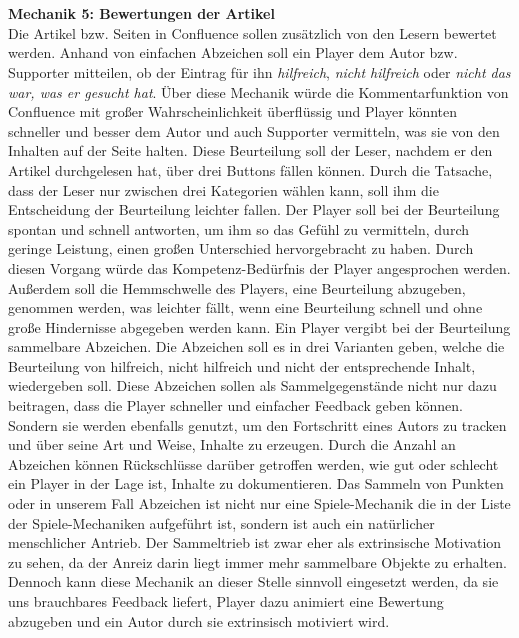 \documentclass[a4paper,12pt,twoside]{scrartcl}
\begin{document}
\\\\
\textbf{Mechanik 5: Bewertungen der Artikel}\\
Die Artikel bzw. Seiten in Confluence sollen zusätzlich von den Lesern bewertet werden. Anhand von einfachen Abzeichen soll ein Player dem Autor bzw. Supporter mitteilen, ob der Eintrag für ihn \textit{hilfreich}, \textit{nicht hilfreich} oder \textit{nicht das war, was er gesucht hat}. Über diese Mechanik würde die Kommentarfunktion von Confluence mit großer Wahrscheinlichkeit überflüssig und Player könnten schneller und besser dem Autor und auch Supporter vermitteln, was sie von den Inhalten auf der Seite halten. Diese Beurteilung soll der Leser, nachdem er den Artikel durchgelesen hat, über drei Buttons fällen können. Durch die Tatsache, dass der Leser nur zwischen drei Kategorien wählen kann, soll ihm die Entscheidung der Beurteilung leichter fallen. Der Player soll bei der Beurteilung spontan und schnell antworten, um ihm so das Gefühl zu vermitteln, durch geringe Leistung, einen großen Unterschied hervorgebracht zu haben. Durch diesen Vorgang würde das Kompetenz-Bedürfnis der Player angesprochen werden. Außerdem soll die Hemmschwelle des Players, eine Beurteilung abzugeben, genommen werden, was leichter fällt, wenn eine Beurteilung schnell und ohne große Hindernisse abgegeben werden kann. Ein Player vergibt bei der Beurteilung sammelbare Abzeichen. Die Abzeichen soll es in drei Varianten geben, welche die Beurteilung von hilfreich, nicht hilfreich und nicht der entsprechende Inhalt, wiedergeben soll. Diese Abzeichen sollen als Sammelgegenstände nicht nur dazu beitragen, dass die Player schneller und einfacher Feedback geben können. Sondern sie werden ebenfalls genutzt, um den Fortschritt eines Autors zu tracken und über seine Art und Weise, Inhalte zu erzeugen. Durch die Anzahl an Abzeichen können Rückschlüsse darüber getroffen werden, wie gut oder schlecht ein Player in der Lage ist, Inhalte zu dokumentieren. Das Sammeln von Punkten oder in unserem Fall Abzeichen ist nicht nur eine Spiele-Mechanik die in der Liste der Spiele-Mechaniken aufgeführt ist, sondern ist auch ein natürlicher menschlicher Antrieb. Der Sammeltrieb ist zwar eher als extrinsische Motivation zu sehen, da der Anreiz darin liegt immer mehr sammelbare Objekte zu erhalten. Dennoch kann diese Mechanik an dieser Stelle sinnvoll eingesetzt werden, da sie uns brauchbares Feedback liefert, Player dazu animiert eine Bewertung abzugeben und ein Autor durch sie extrinsisch motiviert wird.   
\\
\end{document}
